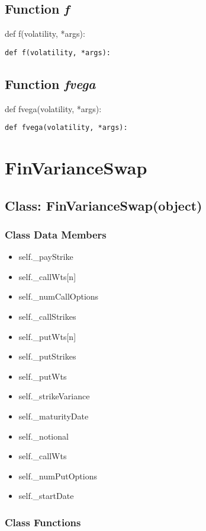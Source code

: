 \documentclass[twoside,11pt]{book}
\begin{document}
\subsection{Function {\it f}}
def f(volatility, *args):

\begin{lstlisting}
def f(volatility, *args):
\end{lstlisting}

\subsection{Function {\it fvega}}
def fvega(volatility, *args):

\begin{lstlisting}
def fvega(volatility, *args):
\end{lstlisting}

\newpage
\section{FinVarianceSwap}

\subsection{Class: FinVarianceSwap(object)}


\subsubsection{Class Data Members}
\begin{itemize}
\item{self.\_payStrike}
\item{self.\_callWts[n]}
\item{self.\_numCallOptions}
\item{self.\_callStrikes}
\item{self.\_putWts[n]}
\item{self.\_putStrikes}
\item{self.\_putWts}
\item{self.\_strikeVariance}
\item{self.\_maturityDate}
\item{self.\_notional}
\item{self.\_callWts}
\item{self.\_numPutOptions}
\item{self.\_startDate}
\end{itemize}

\subsubsection{Class Functions}
\end{document}
